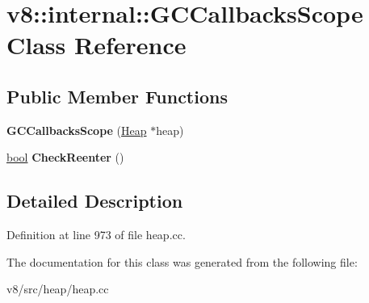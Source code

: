 \hypertarget{classv8_1_1internal_1_1GCCallbacksScope}{}\section{v8\+:\+:internal\+:\+:G\+C\+Callbacks\+Scope Class Reference}
\label{classv8_1_1internal_1_1GCCallbacksScope}
\subsection*{Public Member Functions}
\begin{DoxyCompactItemize}
\item 
\mbox{\label{classv8_1_1internal_1_1GCCallbacksScope_a4e1f52e32b1e4858d57300a08d121068}} 
{\bfseries G\+C\+Callbacks\+Scope} (\mbox{\hyperlink{classv8_1_1internal_1_1Heap}{Heap}} $\ast$heap)
\item 
\mbox{\label{classv8_1_1internal_1_1GCCallbacksScope_acb4a1e89fea6942a7258066801521489}} 
\mbox{\hyperlink{classbool}{bool}} {\bfseries Check\+Reenter} ()
\end{DoxyCompactItemize}


\subsection{Detailed Description}


Definition at line 973 of file heap.\+cc.



The documentation for this class was generated from the following file\+:\begin{DoxyCompactItemize}
\item 
v8/src/heap/heap.\+cc\end{DoxyCompactItemize}
